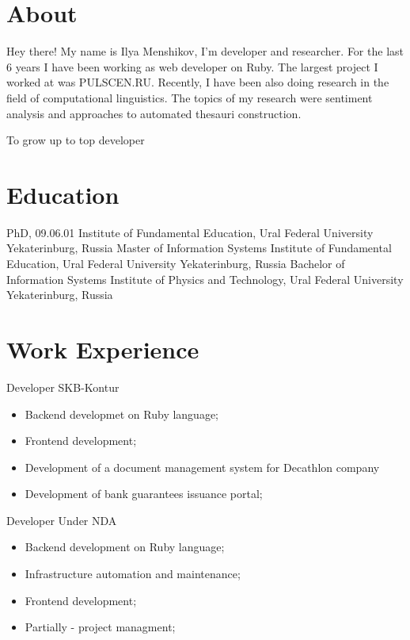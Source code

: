 \documentclass[11pt,a4paper]{moderncv}
\begin{document}
\maketitle

\section{About}
 {
  Hey there! My name is Ilya Menshikov, I'm developer and researcher.
}
\cvitem{} {
  For the last 6 years I have been working as web developer on Ruby. The largest project I worked at was PULSCEN.RU.
}
\cvitem{} {
  Recently, I have been also doing research in the field of computational linguistics. The topics of my research were sentiment analysis and approaches to automated thesauri construction.
}

 {
  To grow up to top developer
}


\section{Education}

  {PhD, 09.06.01}
  {Institute of Fundamental Education, Ural Federal University}
  {Yekaterinburg, Russia}
{}{}
  {Master of Information Systems}
  {Institute of Fundamental Education, Ural Federal University}
  {Yekaterinburg, Russia}
{}{}
  {Bachelor of Information Systems}
  {Institute of Physics and Technology, Ural Federal University}
  {Yekaterinburg, Russia}
{}{}

\section{Work Experience}

  {Developer}{}
  {SKB-Kontur}
  {}
{
\begin{itemize}
  \item Backend developmet on Ruby language;
  \item Frontend development;
  \item Development of a document management system for Decathlon company
  \item Development of bank guarantees issuance portal;
\end{itemize}
}

  {Developer}{}
  {Under NDA}
  {}
{
\begin{itemize}
  \item Backend development on Ruby language;
  \item Infrastructure automation and maintenance;
  \item Frontend development;
  \item Partially - project managment;
\end{itemize}
}
\end{document}

